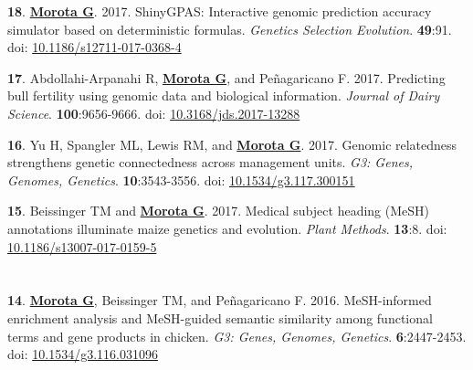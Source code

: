 \documentclass[margin,line,10pt]{res}
\newenvironment{list1}{
  \begin{list}{\ding{113}}{%
      \setlength{\itemsep}{0in}
      \setlength{\parsep}{0in} \setlength{\parskip}{0in}
      \setlength{\topsep}{0in} \setlength{\partopsep}{0in} 
      \setlength{\leftmargin}{0.17in}}}{\end{list}}
\begin{document}
\begin{resume}
\begin{list1}
\item  [{\bf 18}.] \textbf{\underline{Morota G}}. 2017. ShinyGPAS: Interactive genomic prediction accuracy simulator based on deterministic formulas. \emph{Genetics Selection Evolution}. \textbf{49}:91. doi: \textcolor{blue}{\href{https://dx.doi.org/10.1186/s12711-017-0368-4}{10.1186/s12711-017-0368-4}}

  \vspace{0.5cm}
    
\item  [{\bf 17}.] Abdollahi-Arpanahi R, \textbf{\underline{Morota G}}, and  Pe\~{n}agaricano F. 2017. Predicting bull fertility using genomic data and biological information. \emph{Journal of Dairy Science}. \textbf{100}:9656-9666. doi: \textcolor{blue}{\href{https://doi.org/10.3168/jds.2017-13288}{10.3168/jds.2017-13288}}

    \vspace{0.5cm}
    
  \item  [{\bf 16}.]  Yu H, Spangler ML, Lewis RM, and \textbf{\underline{Morota G}}. 2017. Genomic relatedness strengthens genetic connectedness across management units. \emph{G3: Genes, Genomes, Genetics}. \textbf{10}:3543-3556. doi: \textcolor{blue}{\href{https://doi.org/10.1534/g3.117.300151}{10.1534/g3.117.300151}}

    \vspace{0.5cm}
    
\item [{\bf 15}.] Beissinger TM and \textbf{\underline{Morota G}}. 2017. Medical subject heading (MeSH) annotations illuminate maize genetics and evolution. \emph{Plant Methods}. \textbf{13}:8. doi: \textcolor{blue}{\href{http://dx.doi.org/10.1186/s13007-017-0159-5}{10.1186/s13007-017-0159-5}}

\end{list1}



\section{}

\begin{list1}

  \item [{\bf 14}.]  \textbf{\underline{Morota G}}, Beissinger TM, and Pe\~{n}agaricano F. 2016. MeSH-informed enrichment analysis and MeSH-guided semantic similarity among functional terms and gene products in chicken. \emph{G3: Genes, Genomes, Genetics}. \textbf{6}:2447-2453. doi: \textcolor{blue}{\href{http://dx.doi.org/10.1534/g3.116.031096}{10.1534/g3.116.031096}}  


\end{list1}
\end{resume}
\end{document}

